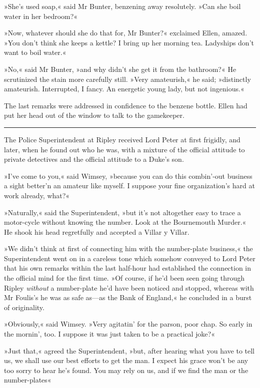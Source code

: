 »She's used soap,« said Mr Bunter, benzening away resolutely. »Can she boil water in her bedroom?«

»Now, whatever should she do that for, Mr Bunter?« exclaimed Ellen, amazed. »You don't think she keeps a kettle? I bring up her morning tea. Ladyships don't want to boil water.«

»No,« said Mr Bunter, »and why didn't she get it from the bathroom?« He scrutinized the stain more carefully still. »Very amateurish,« he said; »distinctly amateurish. Interrupted, I fancy. An energetic young lady, but not ingenious.«

The last remarks were addressed in confidence to the benzene bottle.  Ellen had put her head out of the window to talk to the gamekeeper.

\noindent\hfil\rule{0.5\textwidth}{.4pt}\hfil

The Police Superintendent at Ripley received Lord Peter at first frigidly, and later, when he found out who he was, with a mixture of the official attitude to private detectives and the official attitude to a Duke's son.

»I've come to you,« said Wimsey, »because you can do this combin'-out business a sight better'n an amateur like myself. I suppose your fine organization's hard at work already, what?«

»Naturally,« said the Superintendent, »but it's not altogether easy to trace a motor-cycle without knowing the number. Look at the Bournemouth Murder.« He shook his head regretfully and accepted a Villar y Villar.

»We didn't think at first of connecting him with the number-plate business,« the Superintendent went on in a careless tone which somehow conveyed to Lord Peter that his own remarks within the last half-hour had established the connection in the official mind for the first time. »Of course, if he'd been seen going through Ripley \textit{without} a number-plate he'd have been noticed and stopped, whereas with Mr  Foulis's he was as safe as—as the Bank of England,« he concluded in a burst of originality.

»Obviously,« said Wimsey. »Very agitatin' for the parson, poor chap.  So early in the mornin', too. I suppose it was just taken to be a practical joke?«

»Just that,« agreed the Superintendent, »but, after hearing what you have to tell us, we shall use our best efforts to get the man. I expect his grace won't be any too sorry to hear he's found. You may rely on us, and if we find the man or the number-plates\longdash«

